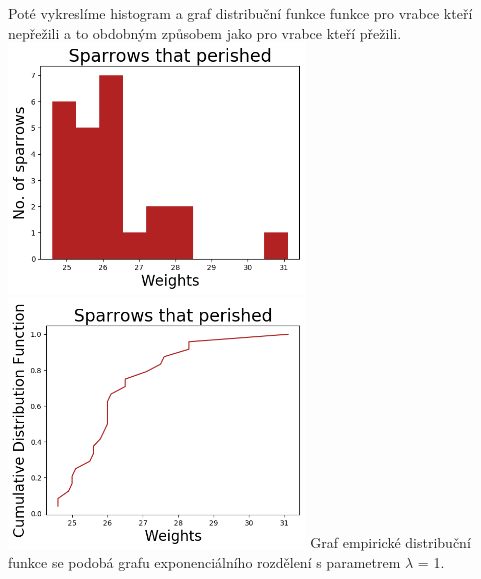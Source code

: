 \documentclass[12pt,a4paper]{article}
\begin{document}
Poté vykreslíme histogram a graf distribuční funkce funkce pro vrabce kteří nepřežili a to obdobným způsobem jako pro vrabce kteří přežili.\\
\includegraphics[width=3.1in]{diedHist}
\includegraphics[width=3.1in]{diedDist}
Graf empirické distribuční funkce se podobá grafu exponenciálního rozdělení s parametrem $\lambda$ = 1.\par \bigskip
\pagebreak
\end{document}
